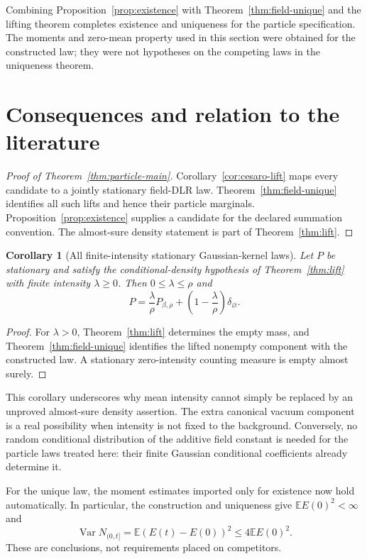 \documentclass[11pt,reqno]{amsart}
\newtheorem{corollary}[theorem]{Corollary}
\theoremstyle{definition}
\theoremstyle{remark}
\newcommand{\E}{\mathbb E}
\newcommand{\1}{\mathbf 1}
\newcommand{\Var}{\operatorname{Var}}
\numberwithin{equation}{section}
\begin{document}
Combining Proposition~\ref{prop:existence} with
Theorem~\ref{thm:field-unique} and the lifting theorem completes
existence and uniqueness for the particle specification. The moments
and zero-mean property used in this section were obtained for the
constructed law; they were not hypotheses on the competing laws in
the uniqueness theorem.

\section{Consequences and relation to the literature}\label{sec:discussion}

\begin{proof}[Proof of Theorem~\ref{thm:particle-main}]
Corollary~\ref{cor:cesaro-lift} maps every candidate to a jointly
stationary field-DLR law. Theorem~\ref{thm:field-unique} identifies
all such lifts and hence their particle marginals. Proposition~\ref{prop:existence}
supplies a candidate for the declared summation convention. The
almost-sure density statement is part of Theorem~\ref{thm:lift}.
\end{proof}

\begin{corollary}[All finite-intensity stationary Gaussian-kernel laws]
Let $P$ be stationary and satisfy the conditional-density hypothesis of
Theorem~\ref{thm:lift} with finite intensity $\lambda\ge0$.
Then $0\le\lambda\le\rho$ and
\[
P=\frac{\lambda}{\rho}P_{\beta,\rho}
+\left(1-\frac{\lambda}{\rho}\right)\delta_{\varnothing}.
\]
\end{corollary}
\begin{proof}
For $\lambda>0$, Theorem~\ref{thm:lift} determines the empty mass,
and Theorem~\ref{thm:field-unique} identifies the lifted nonempty
component with the constructed law. A stationary zero-intensity
counting measure is empty almost surely.
\end{proof}

This corollary underscores why mean intensity cannot simply be replaced
by an unproved almost-sure density assertion. The extra canonical vacuum
component is a real possibility when intensity is not fixed to the
background. Conversely, no random conditional distribution of the
additive field constant is needed for the particle laws treated here:
their finite Gaussian conditional coefficients already determine it.

For the unique law, the moment estimates imported only for existence
now hold automatically. In particular, the construction and uniqueness
give $\E E(0)^2<\infty$ and
\[
\Var N_{(0,t]}=\E(E(t)-E(0))^2\le4\E E(0)^2.
\]
These are conclusions, not requirements placed on competitors.
\end{document}
